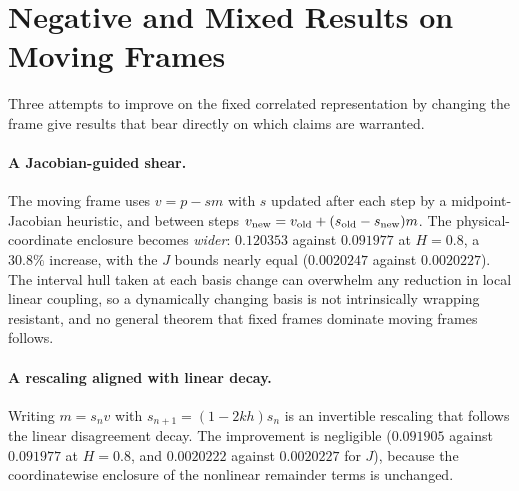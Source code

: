 \documentclass[11pt,notitlepage]{report}
\theoremstyle{definition}
\theoremstyle{remark}
\begin{document}
\section{Negative and Mixed Results on Moving Frames}
Three attempts to improve on the fixed correlated representation by changing the frame give results that bear directly on which claims are warranted.

\paragraph{A Jacobian-guided shear.} The moving frame uses $v=p-sm$ with $s$ updated after each step by a midpoint-Jacobian heuristic, and between steps $v_{\rm new}=v_{\rm old}+(s_{\rm old}-s_{\rm new})m$. The physical-coordinate enclosure becomes \emph{wider}: $0.120353$ against $0.091977$ at $H=0.8$, a $30.8\%$ increase, with the $J$ bounds nearly equal ($0.0020247$ against $0.0020227$). The interval hull taken at each basis change can overwhelm any reduction in local linear coupling, so a dynamically changing basis is not intrinsically wrapping resistant, and no general theorem that fixed frames dominate moving frames follows.

\paragraph{A rescaling aligned with linear decay.} Writing $m=s_nv$ with $s_{n+1}=(1-2kh)s_n$ is an invertible rescaling that follows the linear disagreement decay. The improvement is negligible ($0.091905$ against $0.091977$ at $H=0.8$, and $0.0020222$ against $0.0020227$ for $J$), because the coordinatewise enclosure of the nonlinear remainder terms is unchanged.
\end{document}
